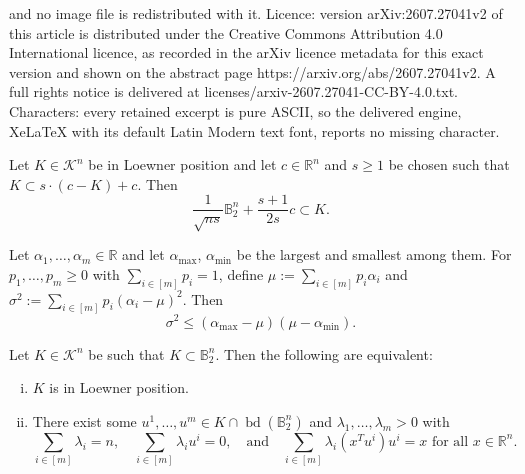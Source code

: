 \documentclass[10pt,a4paper]{amsart}
\DeclareMathOperator{\bd}{bd}
\newcommand\B{\mathbb{B}}
\newcommand\CK{\mathcal{K}}
\newcommand\R{\mathbb{R}}
\begin{document}
and no image file is redistributed with it. Licence: version arXiv:2607.27041v2 of this article is distributed under the Creative Commons Attribution 4.0 International licence, as recorded in the arXiv licence metadata for this exact version and shown on the abstract page https://arxiv.org/abs/2607.27041v2. A full rights notice is delivered at licenses/arxiv-2607.27041-CC-BY-4.0.txt. Characters: every retained excerpt is pure ASCII, so the delivered engine, XeLaTeX with its default Latin Modern text font, reports no missing character.
\begin{lemma} \label{lem:befrconj}
Let $K \in \CK^n$ be in Loewner position and let $c \in \R^n$ and $s \geq 1$ be chosen such that $K \subset s \cdot (c - K) + c$.
Then
\[
	\frac{1}{\sqrt{n s}} \B_2^n + \frac{s+1}{2s} c
	\subset K.
\]
\end{lemma}

\begin{proposition} \label{prop:befr}
Let $\alpha_1, \dots, \alpha_m \in \R$ and let $\alpha_{\max}$, $\alpha_{\min}$ be the largest and smallest among them.
For $p_1, \dots, p_m \geq 0$ with $\sum_{i \in [m]} p_i = 1$,
define $\mu := \sum_{i \in [m]} p_i \alpha_i$ and $\sigma^2 := \sum_{i \in [m]} p_i (\alpha_i - \mu)^2$.
Then
\[
	\sigma^2
	\leq (\alpha_{\max} - \mu) (\mu - \alpha_{\min}).
\]
\end{proposition}

\begin{proposition}\label{prop:lownertheorem}
Let $K \in \CK^n$ be such that $K \subset \B_2^n$.
Then the following are equivalent:
\begin{enumerate}[(i)]
\item $K$ is in Loewner position.
\item There exist some $u^1, \dots, u^m \in K \cap \bd(\B_2^n)$ and $\lambda_1, \dots, \lambda_m > 0$ with
\[
    \sum_{i \in [m]} \lambda_i = n,
        \quad
    \sum_{i \in [m]} \lambda_i u^i = 0,
        \quad \text{and} \quad
    \sum_{i \in [m]} \lambda_i (x^T u^i) u^i = x \text{ for all } x \in \R^n.
\]
\end{enumerate}
\end{proposition}
\end{document}
